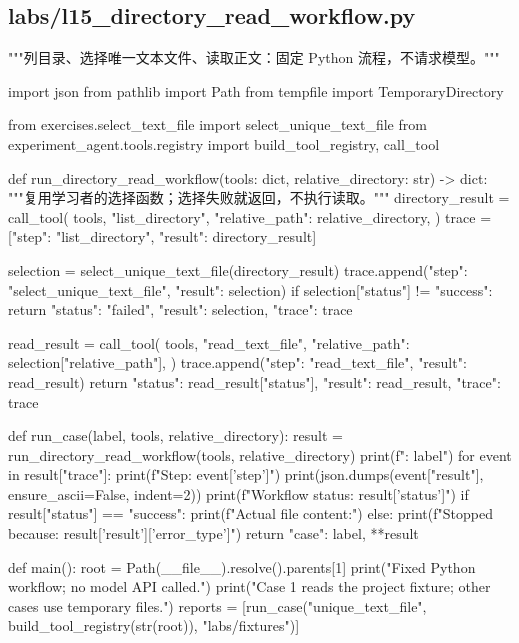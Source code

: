 \documentclass[UTF8,zihao=-4,fontset=fandol]{ctexart}
\begin{document}
\subsection{labs/l15\_directory\_read\_workflow.py}

\begin{Code}
"""列目录、选择唯一文本文件、读取正文：固定 Python 流程，不请求模型。"""

import json
from pathlib import Path
from tempfile import TemporaryDirectory

from exercises.select_text_file import select_unique_text_file
from experiment_agent.tools.registry import build_tool_registry, call_tool


def run_directory_read_workflow(tools: dict, relative_directory: str) -> dict:
    """复用学习者的选择函数；选择失败就返回，不执行读取。"""
    directory_result = call_tool(
        tools, "list_directory", {"relative_path": relative_directory},
    )
    trace = [{"step": "list_directory", "result": directory_result}]

    selection = select_unique_text_file(directory_result)
    trace.append({"step": "select_unique_text_file", "result": selection})
    if selection["status"] != "success":
        return {"status": "failed", "result": selection, "trace": trace}

    read_result = call_tool(
        tools, "read_text_file", {"relative_path": selection["relative_path"]},
    )
    trace.append({"step": "read_text_file", "result": read_result})
    return {"status": read_result["status"], "result": read_result, "trace": trace}


def run_case(label, tools, relative_directory):
    result = run_directory_read_workflow(tools, relative_directory)
    print(f"\nCase: {label}")
    for event in result["trace"]:
        print(f"Step: {event['step']}")
        print(json.dumps(event["result"], ensure_ascii=False, indent=2))
    print(f"Workflow status: {result['status']}")
    if result["status"] == "success":
        print(f"Actual file content:")
    else:
        print(f"Stopped because: {result['result']['error_type']}")
    return {"case": label, **result}


def main():
    root = Path(__file__).resolve().parents[1]
    print("Fixed Python workflow; no model API called.")
    print("Case 1 reads the project fixture; other cases use temporary files.")
    reports = [run_case("unique_text_file", build_tool_registry(str(root)), "labs/fixtures")]


\end{Code}
\end{document}
